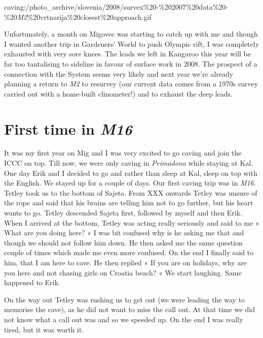 caving:/photo\_archive/slovenia/2008/survex\%20-\%202007\%20data\%20-\%20\emph{M2}\%20vrtnarija\%20closest\%20approach.gif

Unfortunately, a month on Migovec was starting to catch up with me and
though I wanted another trip in Gardeners' World to push Olympic rift, I
was completely exhausted with very sore knees. The leads we left in
Kangaroo this year will be far too tantalising to sideline in favour of
surface work in 2008. The prospect of a connection with the System seems
very likely and next year we're already planning a return to \emph{M2}
to resurvey (our current data comes from a 1970s survey carried out with
a home-built clinometer!) and to exhaust the deep leads.


\hypertarget{first-time-in-m16}{%
\section{\texorpdfstring{First time in
\emph{M16}}{First time in M16}}\label{first-time-in-m16}}

It was my first year on Mig and I was very excited to go caving and join
the ICCC on top. Till now, we were only caving in \emph{Primadona} while
staying at Kal. One day Erik and I decided to go and rather than sleep
at Kal, sleep on top with the English. We stayed up for a couple of
days. Our first caving trip was in \emph{M16}. Tetley took us to the
bottom of Sajeta. From XXX onwards Tetley was unsure of the rope and
said that his brains are telling him not to go further, but his heart
wants to go. Tetley descended Sajeta first, followed by myself and then
Erik. When I arrived at the bottom, Tetley was acting really seriously
and said to me » What are you doing here? « I was bit confused why is he
asking me that and though we should not follow him down. He then asked
me the same question couple of times which made me even more confused.
On the end I finally said to him, that I am here to cave. He then
replied « If you are on holidays, why are you here and not chasing girls
on Croatia beach? « We start laughing. Same happened to Erik.

On the way out Tetley was rushing us to get out (we were leading the way
to memorise the cave), as he did not want to miss the call out. At that
time we did not know what a call out was and so we speeded up. On the
end I was really tired, but it was worth it.

\attrib{\izi}


